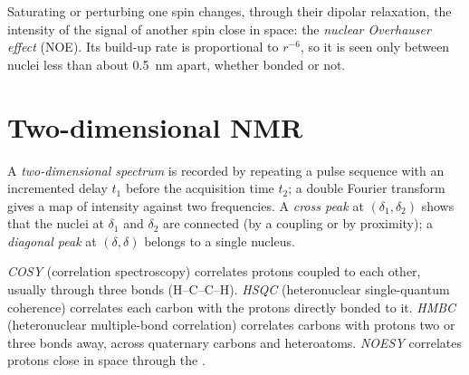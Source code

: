\begin{definition}\label{def:b3:advanced-nmr:noe}
Saturating or perturbing one spin changes, through their dipolar
relaxation, the intensity of the signal of another spin close in space:
the \emph{nuclear Overhauser effect} (NOE).
Its build-up rate is proportional to $r^{-6}$, so it is seen only between
nuclei less than about \qty{0.5}{nm} apart, whether bonded or not.
\end{definition}

\section{Two-dimensional NMR}

\begin{definition}\label{def:b3:advanced-nmr:two-d}
A \emph{two-dimensional spectrum} is recorded by
repeating a pulse sequence with an incremented delay $t_1$ before the
acquisition time $t_2$; a double Fourier transform gives a map of intensity
against two frequencies. A \emph{cross peak} at $(\delta_1,
\delta_2)$ shows that the nuclei at $\delta_1$ and $\delta_2$ are connected (by a coupling or
by proximity); a \emph{diagonal peak} at $(\delta, \delta)$ belongs to
a single nucleus.
\end{definition}

\begin{definition}\label{def:b3:advanced-nmr:experiments}
\emph{COSY} (correlation spectroscopy) correlates protons coupled
to each other, usually through three bonds (H--C--C--H). \emph{HSQC}
(heteronuclear single-quantum coherence) correlates each carbon with the
protons directly bonded to it. \emph{HMBC} (heteronuclear
multiple-bond correlation) correlates carbons with protons two or three bonds
away, across quaternary carbons and heteroatoms. \emph{NOESY}
correlates protons close in space through the .
\end{definition}

